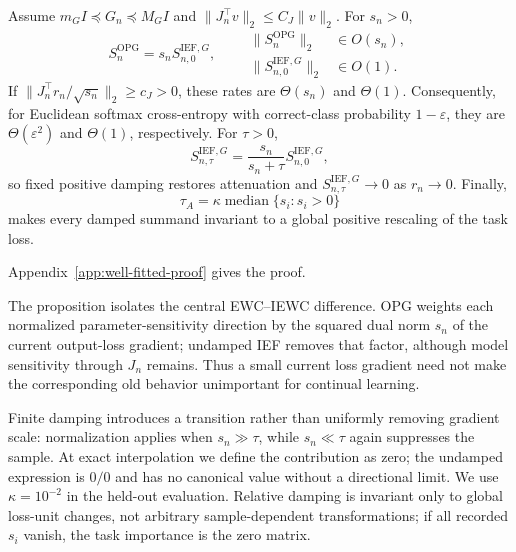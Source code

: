 \begin{proposition}
\label{prop:well-fitted-scaling}
Assume $m_GI\preceq G_n\preceq M_GI$ and
$\|J_n^\top v\|_2\le C_J\|v\|_2$. For $s_n>0$,
\[
S_n^{\mathrm{OPG}}
=s_nS_{n,0}^{\mathrm{IEF},G},
\qquad
\begin{aligned}
\|S_n^{\mathrm{OPG}}\|_2&\in O(s_n),\\
\|S_{n,0}^{\mathrm{IEF},G}\|_2&\in O(1).
\end{aligned}
\]
If $\|J_n^\top r_n/\sqrt{s_n}\|_2\ge c_J>0$, these rates are
$\Theta(s_n)$ and $\Theta(1)$. Consequently, for Euclidean softmax
cross-entropy with correct-class probability $1-\varepsilon$, they are
$\Theta(\varepsilon^2)$ and $\Theta(1)$, respectively. For $\tau>0$,
\[
S_{n,\tau}^{\mathrm{IEF},G}
=
\frac{s_n}{s_n+\tau}S_{n,0}^{\mathrm{IEF},G},
\]
so fixed positive damping restores attenuation and
$S_{n,\tau}^{\mathrm{IEF},G}\to0$ as $r_n\to0$. Finally,
\[
\tau_A
=
\kappa\operatorname{median}\{s_i:s_i>0\}
\]
makes every damped summand invariant to a global positive rescaling of the task loss.
\end{proposition}
Appendix~\ref{app:well-fitted-proof} gives the proof.

The proposition isolates the central EWC--IEWC difference. OPG weights each normalized parameter-sensitivity direction by the squared dual norm $s_n$ of the current output-loss gradient; undamped IEF removes that factor, although model sensitivity through $J_n$ remains. Thus a small current loss gradient need not make the corresponding old behavior unimportant for continual learning.

Finite damping introduces a transition rather than uniformly removing gradient scale: normalization applies when $s_n\gg\tau$, while $s_n\ll\tau$ again suppresses the sample. At exact interpolation we define the contribution as zero; the undamped expression is $0/0$ and has no canonical value without a directional limit. We use $\kappa=10^{-2}$ in the held-out evaluation. Relative damping is invariant only to global loss-unit changes, not arbitrary sample-dependent transformations; if all recorded $s_i$ vanish, the task importance is the zero matrix.
